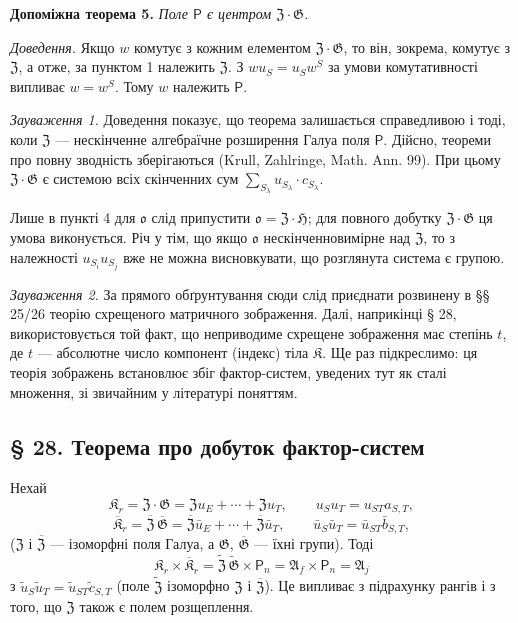 \documentclass[11pt]{article}
\begin{document}
\noindent\textbf{Допоміжна теорема 5.} \emph{Поле \(\mathsf{P}\) є центром \(\mathfrak Z\cdot\mathfrak G\).}

\noindent\emph{Доведення.} Якщо \(w\) комутує з кожним елементом \(\mathfrak Z\cdot\mathfrak G\), то він, зокрема, комутує з \(\mathfrak Z\), а отже, за пунктом 1 належить \(\mathfrak Z\). З \(wu_S=u_Sw^S\) за умови комутативності випливає \(w=w^S\). Тому \(w\) належить \(\mathsf{P}\).

\noindent\emph{Зауваження 1.} Доведення показує, що теорема залишається справедливою і тоді, коли \(\mathfrak Z\) --- нескінченне алгебраїчне розширення Галуа поля \(\mathsf{P}\). Дійсно, теореми про повну зводність зберігаються (Krull, Zahlringe, Math. Ann. 99). При цьому \(\mathfrak Z\cdot\mathfrak G\) є системою всіх скінченних сум \(\sum_{S_\lambda}u_{S_\lambda}\cdot c_{S_\lambda}\).

Лише в пункті 4 для \(\mathfrak o\) слід припустити \(\mathfrak o=\mathfrak Z\cdot\mathfrak H\); для повного добутку \(\mathfrak Z\cdot\mathfrak G\) ця умова виконується. Річ у тім, що якщо \(\mathfrak o\) нескінченновимірне над \(\mathfrak Z\), то з належності \(u_{S_i}u_{S_j}\) вже не можна висновкувати, що розглянута система є групою.

\noindent\emph{Зауваження 2.} За прямого обґрунтування сюди слід приєднати розвинену в §§ 25/26 теорію схрещеного матричного зображення. Далі, наприкінці § 28, використовується той факт, що неприводиме схрещене зображення має степінь \(t\), де \(t\) --- абсолютне число компонент (індекс) тіла \(\mathfrak K\). Ще раз підкреслимо: ця теорія зображень встановлює збіг фактор-систем, уведених тут як сталі множення, зі звичайним у літературі поняттям.

\subsection*{§ 28. Теорема про добуток фактор-систем}\label{produktsatz-fuer-faktorensysteme}

Нехай
\[
\mathfrak K_r=\mathfrak Z\cdot\mathfrak G
=\mathfrak Zu_E+\cdots+\mathfrak Zu_T,
\qquad u_Su_T=u_{ST}a_{S,T},
\]
\[
\overline{\mathfrak K}_r
=\overline{\mathfrak Z}\,\overline{\mathfrak G}
=\overline{\mathfrak Z}\bar u_E+\cdots+\overline{\mathfrak Z}\bar u_T,
\qquad
\bar u_S\bar u_T=\bar u_{ST}\bar b_{S,T},
\]
(\(\mathfrak Z\) і \(\overline{\mathfrak Z}\) --- ізоморфні поля Галуа, а \(\mathfrak G\), \(\overline{\mathfrak G}\) --- їхні групи). Тоді
\[
\mathfrak K_r\times\overline{\mathfrak K}_r
=\widetilde{\mathfrak Z}\,\widetilde{\mathfrak G}\times \mathsf{P}_n
=\mathfrak A_f\times \mathsf{P}_n
=\mathfrak A_j
\]
з \(\tilde u_S\tilde u_T=\tilde u_{ST}\tilde c_{S,T}\) (поле \(\widetilde{\mathfrak Z}\) ізоморфно \(\mathfrak Z\) і \(\overline{\mathfrak Z}\)). Це випливає з підрахунку рангів і з того, що \(\mathfrak Z\) також є полем розщеплення.
\end{document}
